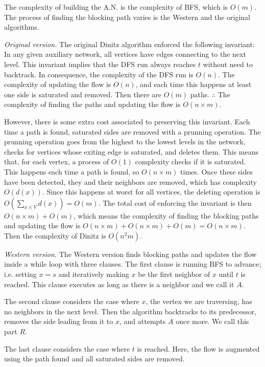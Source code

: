 The complexity of building the A.N. is the complexity of BFS,  which is $O(m)$.
The process of finding the blocking path varies is the Western and the original
algorithms. 

\textit{Original version.} The original Dinitz algorithm enforced the following
invariant: In any given auxiliary network, all vertices have edges connecting
to the next level. This invariant implies that the DFS run always reaches $t$
without need to backtrack. In consequence, the complexity of the DFS run is
$O(n)$. The complexity of updating the flow is $O(n)$, and each time this happens 
at least one side is saturated and removed. Then there are $O(m)$ paths.
$\therefore $ The complexity of finding the paths and updating the flow
is $O(n \times m)$.

However, there is some extra cost associated to preserving this invariant. Each
time a path is found, saturated sides are removed with a prunning operation.
The prunning operation goes from the highest to the lowest levels in the
network, checks for vertices whose exiting edge is saturated, and deletes them.
This means that, for each vertex, a process of $O(1)$ complexity checks if it
is saturated. This happens each time a path is found, so $O(n \times m)$ times.
Once these sides have been detected, they and their neighbors are removed,
which has complexity $O(d(x))$. Since this happens at worst for all vertices,
the deleting operation is $O\left( \sum_{x \in V} d(x) \right) = O(m)$. The
total cost of enforcing the invariant is then $O(n \times m) + O(m)$, which
means the complexity of finding the blocking paths and updating the flow is
$O(n \times m) + O(n \times m) + O(m) = O(n \times m) $. Then the complexity of
Dinitz is $O(n^2m)$.

\textit{Western version.} The Western version finds blocking paths and updates 
the flow inside a while loop with three clauses. The first clause is 
running BFS to advance; i.e. setting $x = s$ and iteratively making 
$x$ be the first neighbor of $x$ until $t$ is reached. This clause executes 
as long as there is a neighbor and we call it $A$.

The second clause considers the case where $x$, the vertex we are 
traversing, has no neighbors in the next level. Then the algorithm
backtracks to its predecessor, removes the side leading from it to $x$,
and attempts $A$ once more. We call this part $R$.

The last clause considers the case where $t$ is reached. Here, 
the flow is augmented using the path found and all saturated 
sides are removed.

